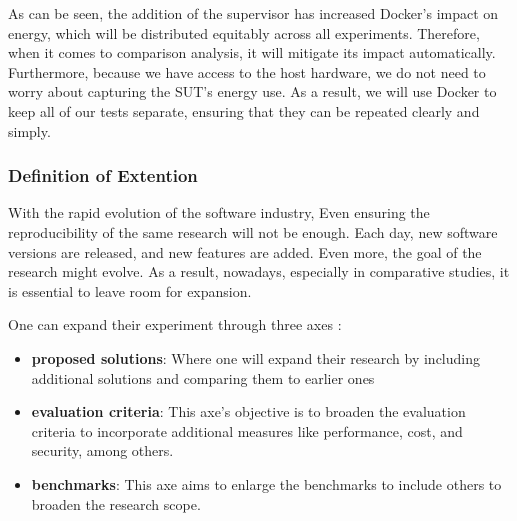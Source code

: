 As can be seen, the addition of the supervisor has increased Docker's impact on energy, which will be distributed equitably across all experiments.
Therefore, when it comes to comparison analysis, it will mitigate its impact automatically.
Furthermore, because we have access to the host hardware, we do not need to worry about capturing the SUT's energy use.
As a result, we will use Docker to keep all of our tests separate, ensuring that they can be repeated clearly and simply.


\subsubsection{Definition of Extention}
With the rapid evolution of the software industry, Even ensuring the reproducibility of the same research will not be enough.
Each day, new software versions are released, and new features are added. Even more, the goal of the research might evolve. As a result, nowadays, especially in comparative studies, it is essential to leave room for expansion.

One can expand their experiment through three axes :
\begin{itemize}
    \item \textbf{proposed solutions}: Where one will expand their research by including additional solutions and comparing them to earlier ones
    \item \textbf{evaluation criteria}: This axe's objective is to broaden the evaluation criteria to incorporate additional measures like performance, cost, and security, among others.
    \item \textbf{benchmarks}: This axe aims to enlarge the benchmarks to include others to broaden the research scope.
\end{itemize}

